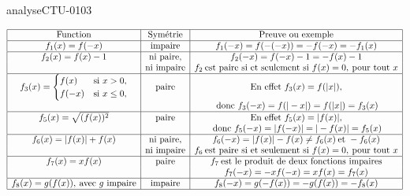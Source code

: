 \begin{corrige}{analyseCTU-0103}
\begin{enumerate}
\begin{equation*}
        \begin{array}{|c|c|c|}
         \hline
         \text{Function} & \text{Sym\'etrie} & \text{Preuve ou exemple}\\
          \hline
            f_1 (x) = f(-x) & \text{impaire} & f_1 (-x) = f(-(-x)) = -f(-x) = -f_1(x) \\
            \hline
            f_2 (x) = f(x)-1 & \text{ ni paire, } & f_2 (-x) = f(-x)-1 =-f(x)-1  \\
&\text{ni impaire}&f_2 \:\text{est paire si et seulement si } f (x) = 0, \:\text{pour tout }x\\
            \hline
            f_3 (x)= 
            \begin{cases}
              f(x) &\text{si } x>0, \\
              f(-x)& \text{si } x\leq 0,
            \end{cases} &\text{paire} & \text{En effet } f_3(x) = f(|x|),\\
            && \:\text{donc } f_3(-x) = f(|-x|)= f(|x|) = f_3 (x) \\
            \hline
            f_5(x) = \sqrt{(f(x))^2} &\text{paire}& \text{En effet } f_5(x) = |f(x)|,\\
            && \:\text{donc } f_5(-x) = |f(-x)| = |-f(x)| = f_5(x)\\
            \hline
            f_6(x)= |f(x)| + f(x) &\text{ ni paire, }& f_6(-x) = |f(x)| - f(x) \neq f_6(x)\:\text{et } -f_6(x)  \\
&\text{ni impaire} & f_6 \:\text{est paire si et seulement si } f (x) = 0, \:\text{pour tout }x\\
            \hline
            f_7(x) = xf(x)&\text{paire}& f_7 \: \text{est le produit de deux fonctions impaires} \\
            &&f_7(-x) = -xf(-x) = xf(x) = f_7(x)\\
            \hline
            f_8(x) = g(f(x)), \:\text{avec $g$ impaire} &\text{impaire}& f_8(-x) = g(-f(x))= -g(f(x))=-f_8(x) \\
\hline
        \end{array}
      \end{equation*}
  \end{enumerate} 
\end{corrige}
